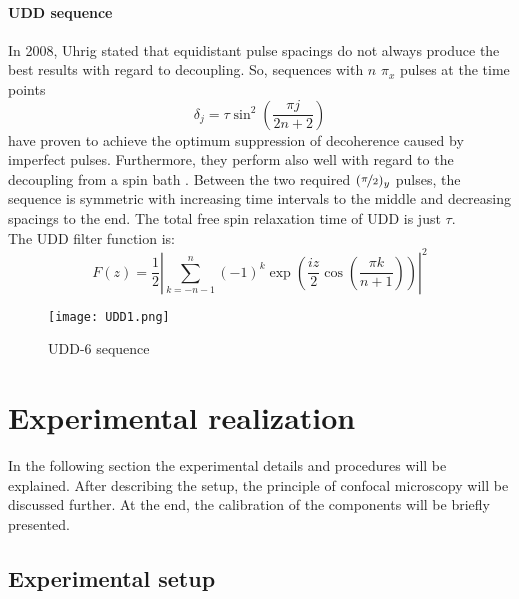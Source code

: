 \documentclass[12pt,a4paper]{article}
\begin{document}
\paragraph{UDD sequence}\label{udd}
In 2008, Uhrig stated that equidistant pulse spacings do not always produce the best results with regard to decoupling\cite{udd}. So, sequences with $n$ $\pi_x$ pulses at the time points
\begin{equation}\label{udde}
\delta_j=\tau\sin^2\left(\frac{\pi j}{2n+2}\right)
\end{equation}
have proven to achieve the optimum suppression of decoherence caused by imperfect pulses. Furthermore, they perform also well with regard to the decoupling from a spin bath \cite{udd}. Between the two required $(\nicefrac{\pi}{2})_y$ pulses, the sequence is symmetric with increasing time intervals to the middle and decreasing spacings to the end. The total free spin relaxation time of UDD is just $\tau$.\\
The UDD filter function is:
\begin{equation}
F(z)=\frac{1}{2}\left|\sum^n_{k=-n-1}(-1)^k\exp\left(\frac{iz}{2}\cos\left(\frac{\pi k}{n+1}\right)\right)\right|^2
\end{equation}
\begin{figure}[H]
\centering
\texttt{[image: UDD1.png]} 
\caption{UDD-6 sequence}
\end{figure} 

\section{Experimental realization}
In the following section the experimental details and procedures will be explained. After describing the setup, the principle of confocal microscopy will be discussed further. At the end, the calibration of the components will be briefly presented. 
\subsection{Experimental setup}
\end{document}
